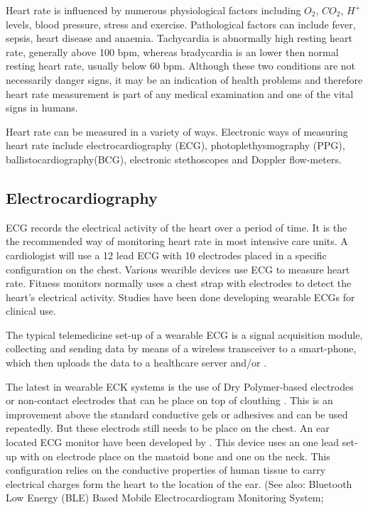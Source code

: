 Heart rate is influenced by numerous physiological factors including $O_2$, $CO_2$, $H^+$ levels, blood pressure, stress and exercise. Pathological factors can include fever, sepsis, heart disease and anaemia. Tachycardia is abnormally high resting heart rate, generally above 100 bpm, whereas bradycardia is an lower then normal resting heart rate, usually below 60 bpm. Although these two conditions are not necessarily danger signs, it may be an indication of health problems and therefore heart rate measurement is part of any medical examination and one of the vital signs in humans.

Heart rate can be measured in a variety of ways. Electronic ways of measuring heart rate include electrocardiography (ECG), photoplethysmography (PPG), ballistocardiography(BCG), electronic stethoscopes and Doppler flow-meters.

\subsection{Electrocardiography}
ECG records the electrical activity of the heart over a period of time. It is the the recommended way of monitoring heart rate in most intensive care units. A cardiologist will use a 12 lead ECG with 10 electrodes placed in a specific configuration on the chest. Various wearible devices use ECG to measure heart rate. Fitness monitors normally uses a chest strap with electrodes to detect the heart's electrical activity. Studies have been done developing wearable ECGs for clinical use.

The typical telemedicine set-up of a wearable ECG is a signal acquisition module, collecting and sending data by means of a wireless transceiver to a smart-phone, which then uploads the data to a healthcare server \citep{wang2010wearable} and/or \citep{prawiro2016integrated}. %

The latest in wearable ECK systems is the use of Dry Polymer-based electrodes \citep{wang2010wearable} or non-contact electrodes that can be place on top of clouthing \citep{lin2013development}. This is an improvement above the standard conductive gels or adhesives and can be used repeatedly. But these electrods still needs to be place on the chest. An ear located ECG monitor have been developed by \cite{winokur2012wearable}. This device uses an one lead set-up with on electrode place on the mastoid bone and one on the neck. This configuration relies on the conductive properties of human tissue to carry electrical charges form the heart to the location of the ear. (See also: Bluetooth Low Energy (BLE) Based Mobile Electrocardiogram Monitoring System; 

